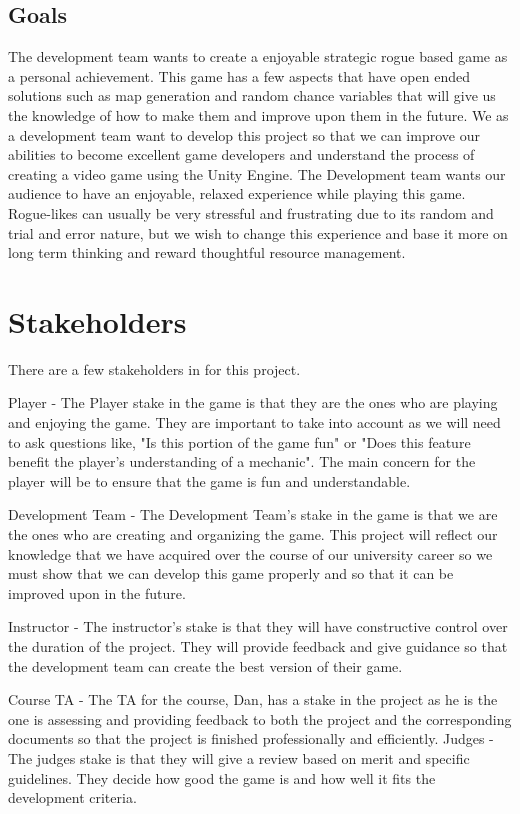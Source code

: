 \documentclass{article}
\begin{document}
\subsection{Goals}
\quad The development team wants to create a enjoyable strategic rogue based game as a personal achievement. This game has a few aspects that have open ended solutions such as map generation and random chance variables that will give us the knowledge of how to make them and improve upon them in the future. We as a development team want to develop this project so that we can improve our abilities to become excellent game developers and understand the process of creating a video game using the Unity Engine. The Development team wants our audience to have an enjoyable, relaxed experience while playing this game. Rogue-likes can usually be very stressful and frustrating due to its random and trial and error nature, but we wish to change this experience and base it more on long term thinking and reward thoughtful resource management.
\section{Stakeholders}
\quad There are a few stakeholders in for this project.\par
Player -  The Player stake in the game is that they are the ones who are playing and enjoying the game. They are important to take into account as we will need to ask questions like, "Is this portion of the game fun" or "Does this feature benefit the player's understanding of a mechanic". The main concern for the player will be to ensure that the game is fun and understandable. \par
Development Team - The Development Team's stake in the game is that we are the ones who are creating and organizing the game. This project will reflect our knowledge that we have acquired over the course of our university career so we must show that we can develop this game properly and so that it can be improved upon in the future. \par
Instructor - The instructor's stake is that they will have constructive control over the duration of the project. They will provide feedback and give guidance so that the development team can create the best version of their game.\par
Course TA - The TA for the course, Dan, has a stake in the project as he is the one is assessing and providing feedback to both the project and the corresponding documents so that the project is finished professionally and efficiently.
Judges - The judges stake is that they will give a review based on merit and specific guidelines. They decide how good the game is and how well it fits the development criteria.
\end{document}
